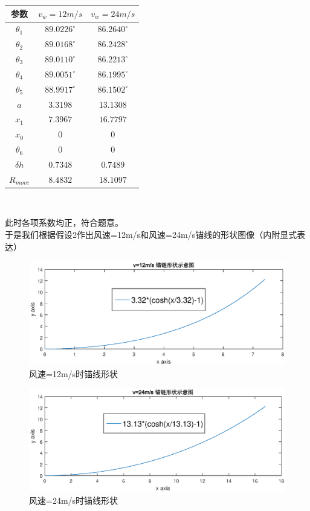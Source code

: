 \documentclass[a4paper,12pt]{ctexart}
\begin{document}
\begin{center}
\begin{tabular}{ccc}
\hline \hline
\multicolumn{1}{c}{参数}&\multicolumn{1}{c}{$v_w=12m/s$}&\multicolumn{1}{c}{$v_w=24m/s$}\\
\hline
$\theta_1$ & $89.0226^{\circ}$& $86.2640^{\circ}$\\
$\theta_2$ & $89.0168^{\circ}$& $86.2428^{\circ}$\\
$\theta_3$ & $89.0110^{\circ}$& $86.2213^{\circ}$\\
$\theta_4$ & $89.0051^{\circ}$& $86.1995^{\circ}$\\
$\theta_5$ & $88.9917^{\circ}$& $86.1502^{\circ}$\\
$a$ & $3.3198$ & $13.1308$ \\
$x_1$&$7.3967$&$16.7797$ \\
$x_0$&$0$&$0$ \\
$\theta_6$ & $0$ & $0$ \\
$\delta h$&$0.7348$&$0.7489$\\
$R_{move}$&$8.4832$&$18.1097$ \\
\hline \hline
\end{tabular}\\
\end{center}
此时各项系数均正，符合题意。\\
于是我们根据假设2作出风速=12m/s和风速=24m/s锚线的形状图像（内附显式表达）\\
\begin{figure}[H]
\centering
\includegraphics[width=380pt]{V12ms.eps}
\caption{风速=12m/s时锚线形状}
\end{figure}

\begin{figure}[H]
\centering
\includegraphics[width=380pt]{V24ms.eps}
\caption{风速=24m/s时锚线形状}
\end{figure}
\end{document}
